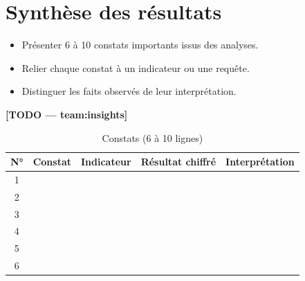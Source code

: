 \section{Synthèse des résultats}
\begin{itemize}
  \item Présenter 6 à 10 constats importants issus des analyses.
  \item Relier chaque constat à un indicateur ou une requête.
  \item Distinguer les faits observés de leur interprétation.
\end{itemize}
\textbf{[TODO — team:insights]}

\begin{longtable}{cp{2.5cm}p{2.5cm}p{2.5cm}p{3.5cm}}
\caption{Constats (6 à 10 lignes)} \\
\toprule
N° & Constat & Indicateur & Résultat chiffré & Interprétation \\
\midrule
\endhead
1 & & & & \\
2 & & & & \\
3 & & & & \\
4 & & & & \\
5 & & & & \\
6 & & & & \\
\bottomrule
\end{longtable}
